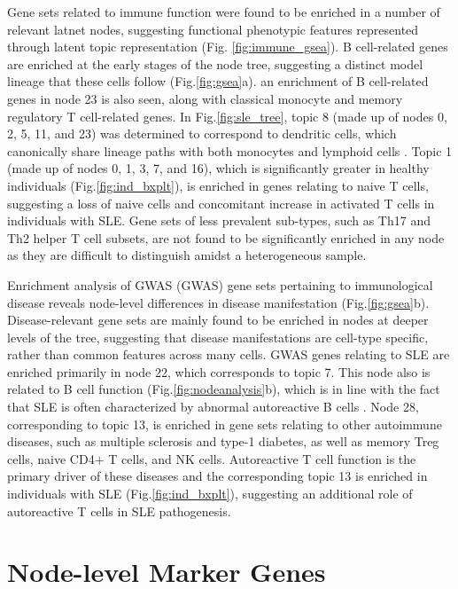 Gene sets related to immune function were found to be enriched in a number of relevant latnet nodes, suggesting functional phenotypic features represented through latent topic representation (Fig. \ref{fig:immune_gsea}). B cell-related genes are enriched at the early stages of the node tree, suggesting a distinct model lineage that these cells follow (Fig.\ref{fig:gsea}a). an enrichment of B cell-related genes in node 23 is also seen, along with classical monocyte and memory regulatory T cell-related genes. In Fig.\ref{fig:sle_tree}, topic 8 (made up of nodes 0, 2, 5, 11, and 23) was determined to correspond to dendritic cells, which canonically share lineage paths with both monocytes and lymphoid cells \cite{immunediff}. Topic 1 (made up of nodes 0, 1, 3, 7, and 16), which is significantly greater in healthy individuals (Fig.\ref{fig:ind_bxplt}), is enriched in genes relating to naive T cells, suggesting a loss of naive cells and concomitant increase in activated T cells in individuals with SLE. Gene sets of less prevalent sub-types, such as Th17 and Th2 helper T cell subsets, are not found to be significantly enriched in any node as they are difficult to distinguish amidst a heterogeneous sample. 

Enrichment analysis of GWAS (GWAS) gene sets pertaining to immunological disease reveals node-level differences in disease manifestation (Fig.\ref{fig:gsea}b). Disease-relevant gene sets are mainly found to be enriched in nodes at deeper levels of the tree, suggesting that disease manifestations are cell-type specific, rather than common features across many cells. GWAS genes relating to SLE are enriched primarily in node 22, which corresponds to topic 7. This node also is related to B cell function (Fig.\ref{fig:nodeanalysis}b), which is in line with the fact that SLE is often characterized by abnormal autoreactive B cells \cite{slebcells}. Node 28, corresponding to topic 13, is enriched in gene sets relating to other autoimmune diseases, such as multiple sclerosis and type-1 diabetes, as well as memory Treg cells, naive CD4+ T cells, and NK cells. Autoreactive T cell function is the primary driver of these diseases \cite{ms, t1d} and the corresponding topic 13 is enriched in individuals with SLE (Fig.\ref{fig:ind_bxplt}), suggesting an additional role of autoreactive T cells in SLE pathogenesis. 

\newpage
\section{Node-level Marker Genes}

